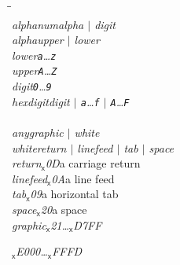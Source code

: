 \documentclass[a4paper,dvips]{article}
\newenvironment{productions}%
  {\begin{tabbing}\hspace{2cm}\=\hspace{6cm}\=\kill{}\\}%
  {\end{tabbing}}
\newcommand{\fixed}[1]{\makebox[3.5em]{#1}}
\newcommand{\production}[3]{\nont{#1}\>\fixed{$\rightarrow$}\nont{#2}\>#3\\}
\newcommand{\next}[2]{\strut{}\>\fixed{$|$}\nont{#1}\>#2\\}
\newcommand{\nont}[1]{\textit{#1}}
\newcommand{\term}[1]{{\tt #1}}
\newcommand{\charcode}[1]{{\rm $_\textsf{x}$#1}}
\newcommand{\por}{$|$}
\begin{document}
\begin{productions}
\production{alphanum}{alpha \por{} digit}{}
\production{alpha}{upper \por{} lower}{}
\production{lower}{\term{a}\ldots\term{z}}{}
\production{upper}{\term{A}\ldots\term{Z}}{}
\production{digit}{\term{0}\ldots\term{9}}{}
\production{hexdigit}{digit \por{} \term{a}\ldots\term{f} \por{} \term{A}\ldots\term{F}}{}
\\
\production{any}{graphic \por{} white}{}
\production{white}{return \por{} linefeed \por{} tab \por{} space}{}
\production{return}{\charcode{0D}}{a carriage return}
\production{linefeed}{\charcode{0A}}{a line feed}
\production{tab}{\charcode{09}}{a horizontal tab}
\production{space}{\charcode{20}}{a space}
\production{graphic}{\charcode{21}\ldots\charcode{D7FF}}{}
\next{\charcode{E000}\ldots\charcode{FFFD}}{}
\end{productions}
\end{document}

